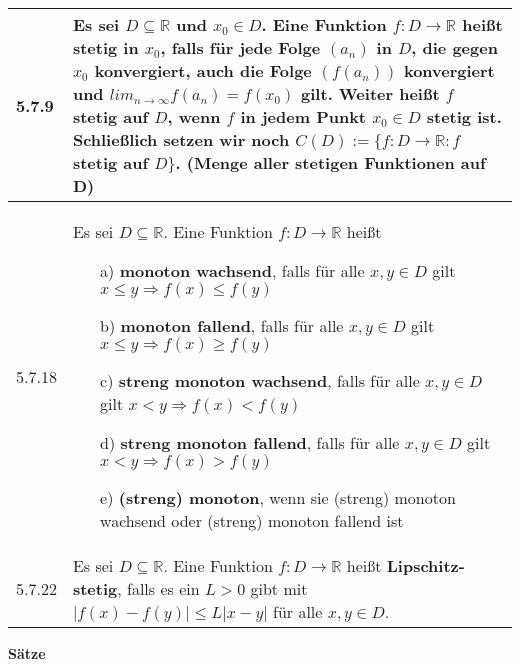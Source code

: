     \begin{longtable}{p{1cm} p{16cm}}
        \toprule

        5.7.9 & Es sei $D \subseteq \mathbb{R}$ und $x_0 \in D$. Eine Funktion $f : D \rightarrow \mathbb{R}$ heißt
                \textbf{stetig} in $x_0$, falls für jede Folge $(a_n)$ in $D$, die gegen $x_0$ konvergiert, auch die Folge $(f(a_n))$ 
                konvergiert und $lim_{n \rightarrow \infty} f(a_n) = f(x_0)$ gilt. \hfill \break 
                Weiter heißt $f$ stetig auf $D$, wenn $f$ in jedem Punkt $x_0 \in D$ stetig ist. \hfill \break
                Schließlich setzen wir noch $C(D) := \{f:D \rightarrow \mathbb{R}: f$ stetig auf $D\}$. 
                (Menge aller stetigen Funktionen auf D) \\
        \midrule
        5.7.18& Es sei $D \subseteq \mathbb{R}$. Eine Funktion $f: D \rightarrow \mathbb{R}$ heißt
                \begin{itemize}[topsep=-0.5cm]
                    \item[a)] \textbf{monoton wachsend}, falls für alle $x,y \in D$ gilt $x \leq y \Rightarrow f(x) \leq f(y)$
                    \item[b)] \textbf{monoton fallend}, falls für alle $x,y \in D$ gilt $x \leq y \Rightarrow f(x) \geq f(y)$
                    \item[c)] \textbf{streng monoton wachsend}, falls für alle $x,y \in D$ gilt $x < y \Rightarrow f(x) < f(y)$
                    \item[d)] \textbf{streng monoton fallend}, falls für alle $x,y \in D$ gilt $x < y \Rightarrow f(x) > f(y)$
                    \item[e)] \textbf{(streng) monoton}, wenn sie (streng) monoton wachsend oder (streng) monoton fallend ist 
                \end{itemize} \vspace{-0cm} \\
        \midrule
        5.7.22& Es sei $D \subseteq \mathbb{R}$. Eine Funktion $f : D \rightarrow \mathbb{R}$ heißt \textbf{Lipschitz-stetig}, falls
                es ein $L > 0$ gibt mit $|f(x) - f(y)| \leq L|x-y|$ für alle $x,y \in D$. \\

        \bottomrule

    \end{longtable}
    

    \noindent 
    \textbf{Sätze}
    

